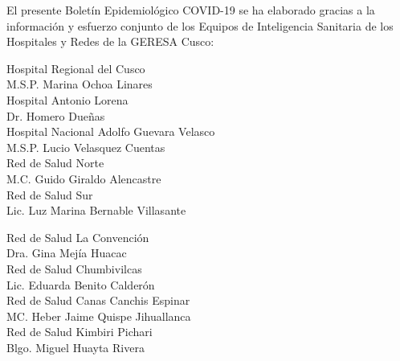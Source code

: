\documentclass[12pt,a4paper,openany]{book}
\begin{document}
	\centering
	{\large El presente Boletín Epidemiológico COVID-19 se ha elaborado gracias a la información y esfuerzo conjunto de los Equipos de Inteligencia Sanitaria de los Hospitales y Redes de la GERESA Cusco:
		
		\vspace{0.5cm}
		\noindent
		\begin{minipage}[t]{.45\textwidth}
			\centering
			Hospital Regional del Cusco \\
			M.S.P. Marina Ochoa Linares \vspace{0.5cm}\\
			Hospital Antonio Lorena \\
			Dr. Homero Dueñas \vspace{.5cm}\\
			Hospital Nacional Adolfo Guevara Velasco\\
			M.S.P. Lucio Velasquez Cuentas \vspace{.5cm}\\
			Red de Salud Norte \\
			M.C. Guido Giraldo Alencastre\vspace{0.5cm}\\
			Red de Salud Sur\\
			Lic. Luz Marina Bernable Villasante \vspace{0.5cm}\\	
		\end{minipage}
		\hfill
		\noindent
		\begin{minipage}[t]{.45\textwidth}
			\centering
			Red de Salud La Convención\\
			Dra. Gina Mejía Huacac\vspace{0.5cm}\\
			Red de Salud Chumbivilcas\\
			Lic. Eduarda Benito Calderón \vspace{.5cm}\\
			Red de Salud Canas Canchis Espinar\\
			MC. Heber Jaime Quispe Jihuallanca \vspace{.5cm}\\
			Red de Salud Kimbiri Pichari \\
			Blgo. Miguel Huayta Rivera\vspace{0.5cm}\\	
		\end{minipage}
}
\end{document}
